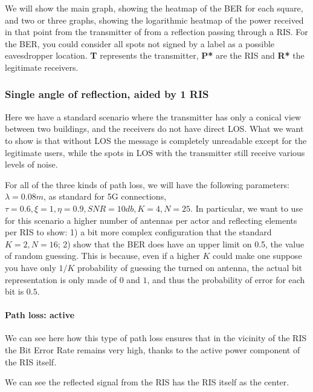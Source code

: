 We will show the main graph, showing the heatmap of the BER for each square, and two or three graphs, showing the logarithmic heatmap of the power received in that point from the transmitter of from a reflection passing through a RIS. For the BER, you could consider all spots not signed by a label as a possible eavesdropper location. \textbf{T} represents the transmitter, \textbf{P*} are the RIS and \textbf{R*} the legitimate receivers.

\subsubsection{Single angle of reflection, aided by 1 RIS}

Here we have a standard scenario where the transmitter has only a conical view between two buildings, and the receivers do not have direct LOS. What we want to show is that without LOS the message is completely unreadable except for the legitimate users, while the spots in LOS with the transmitter still receive various levels of noise.

For all of the three kinds of path loss, we will have the following parameters: $\lambda = 0.08m$, as standard for 5G connections, $ \tau = 0.6, \xi = 1, \eta = 0.9, SNR = 10db, K = 4, N = 25$. In particular, we want to use for this scenario a higher number of antennas per actor and reflecting elements per RIS to show: 1) a bit more complex configuration that the standard $K = 2, N = 16$; 2) show that the BER does have an upper limit on 0.5, the value of random guessing. This is because, even if a higher $K$ could make one suppose you have only $1/K$ probability of guessing the turned on antenna, the actual bit representation is only made of $0$ and $1$, and thus the probability of error for each bit is $0.5$.

\paragraph*{Path loss: active}

We can see here how this type of path loss ensures that in the vicinity of the RIS the Bit Error Rate remains very high, thanks to the active power component of the RIS itself.

We can see the reflected signal from the RIS has the RIS itself as the center.

